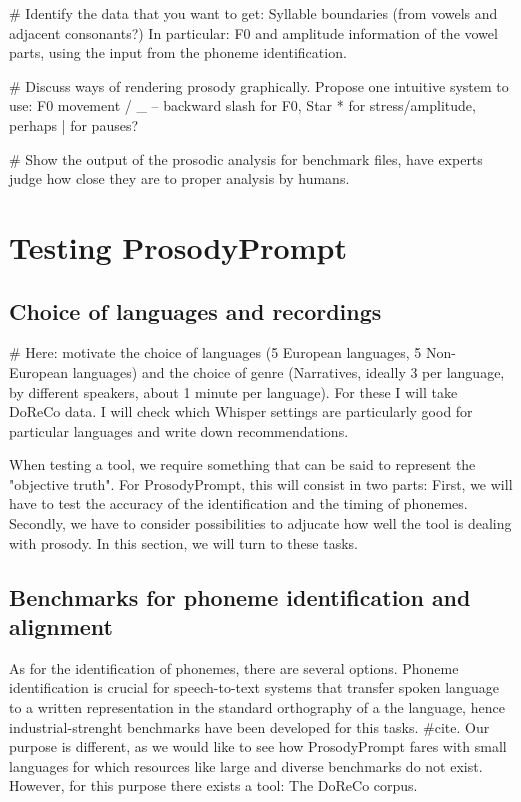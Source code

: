 # Identify the data that you want to get: Syllable boundaries (from vowels and adjacent consonants?) In particular: F0 and amplitude information of the vowel parts, using the input from the phoneme identification. 

# Discuss ways of rendering prosody graphically. Propose one intuitive system to use: F0 movement / _ -- backward slash for F0, Star * for stress/amplitude, perhaps | for pauses?

# Show the output of the prosodic analysis for benchmark files, have experts judge how close they are to proper analysis by humans. 

\chapter{Testing ProsodyPrompt}
\label{testing}

\section{Choice of languages and recordings}

# Here: motivate the choice of languages (5 European languages, 5 Non-European languages) and the choice of genre (Narratives, ideally 3 per language, by different speakers, about 1 minute per language). For these I will take DoReCo data. I will check which Whisper settings are particularly good for particular languages and write down recommendations. 

When testing a tool, we require something that can be said to represent the "objective truth". For ProsodyPrompt, this will consist in two parts: First, we will have to test the accuracy of the identification and the timing of phonemes. Secondly, we have to consider possibilities to adjucate how well the tool is dealing with prosody. In this section, we will turn to these tasks. 

\section{Benchmarks for phoneme identification and alignment}

As for the identification of phonemes, there are several options. Phoneme identification is crucial for speech-to-text systems that transfer spoken language to a written representation in the standard orthography of a the language, hence industrial-strenght benchmarks have been developed for this tasks. #cite. Our purpose is different, as we would like to see how ProsodyPrompt fares with small languages for which resources like large and diverse benchmarks do not exist. However, for this purpose there exists a tool: The DoReCo corpus. 

